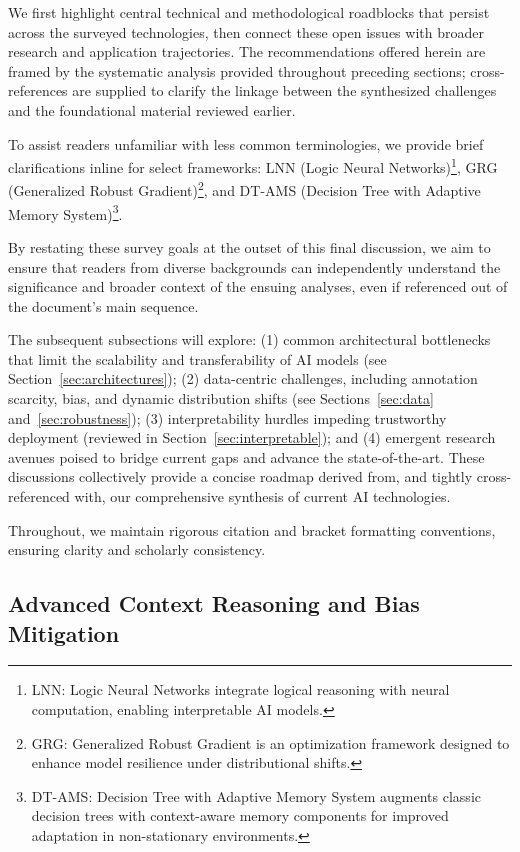 \documentclass[sigconf]{acmart}
\begin{document}
We first highlight central technical and methodological roadblocks that persist across the surveyed technologies, then connect these open issues with broader research and application trajectories. The recommendations offered herein are framed by the systematic analysis provided throughout preceding sections; cross-references are supplied to clarify the linkage between the synthesized challenges and the foundational material reviewed earlier.

To assist readers unfamiliar with less common terminologies, we provide brief clarifications inline for select frameworks: LNN (Logic Neural Networks)\footnote{LNN: Logic Neural Networks integrate logical reasoning with neural computation, enabling interpretable AI models.}, GRG (Generalized Robust Gradient)\footnote{GRG: Generalized Robust Gradient is an optimization framework designed to enhance model resilience under distributional shifts.}, and DT-AMS (Decision Tree with Adaptive Memory System)\footnote{DT-AMS: Decision Tree with Adaptive Memory System augments classic decision trees with context-aware memory components for improved adaptation in non-stationary environments.}.

By restating these survey goals at the outset of this final discussion, we aim to ensure that readers from diverse backgrounds can independently understand the significance and broader context of the ensuing analyses, even if referenced out of the document's main sequence.

The subsequent subsections will explore: (1) common architectural bottlenecks that limit the scalability and transferability of AI models (see Section~\ref{sec:architectures}); (2) data-centric challenges, including annotation scarcity, bias, and dynamic distribution shifts (see Sections~\ref{sec:data} and~\ref{sec:robustness}); (3) interpretability hurdles impeding trustworthy deployment (reviewed in Section~\ref{sec:interpretable}); and (4) emergent research avenues poised to bridge current gaps and advance the state-of-the-art. These discussions collectively provide a concise roadmap derived from, and tightly cross-referenced with, our comprehensive synthesis of current AI technologies.

Throughout, we maintain rigorous citation and bracket formatting conventions, ensuring clarity and scholarly consistency.

\subsection{Advanced Context Reasoning and Bias Mitigation}
\end{document}

